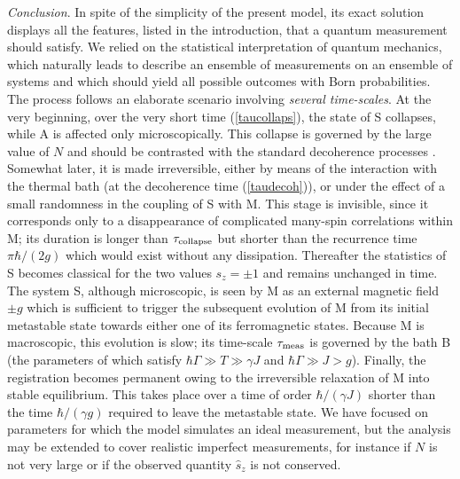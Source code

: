 \begin{multicols}{2}
{\it Conclusion}. In spite of the simplicity of the present model,
its exact solution displays all the features, listed in the introduction,
that a quantum measurement should satisfy. We relied on the
statistical interpretation of quantum mechanics, which naturally leads to
describe an ensemble of measurements on an ensemble of systems and 
which should yield all possible outcomes with Born probabilities.
The process follows an elaborate 
scenario involving {\it several time-scales}. At the very beginning,
over the very short time (\ref{taucollaps}), the state of S collapses,
while A is affected only microscopically. This collapse is governed by 
the large value of $N$ and should be contrasted with the standard decoherence 
processes \cite{wh,models}. 
Somewhat later, it is made irreversible, either by means of the 
interaction with the thermal bath (at the decoherence time (\ref{taudecoh})), 
or under the effect of a small randomness in the coupling
of S with M. This stage is invisible, since it corresponds only 
to a disappearance of complicated many-spin
correlations within M; its duration is longer than $\tau_{\rm collapse}$ 
but shorter than the recurrence time $\pi\hbar/(2g)$
which would exist without any dissipation.
Thereafter the statistics of S becomes classical for the two
values $s_z=\pm 1$ and remains unchanged in time. The system S, although
microscopic, is seen by M as an external magnetic field $\pm g$ which is
sufficient to trigger the subsequent evolution of M from its initial
metastable state towards either one of its ferromagnetic states. Because M
is macroscopic, this evolution is slow; its time-scale $\tau_{\rm meas}$
is governed by the bath B (the parameters of which satisfy
$\hbar\Gamma\gg T\gg \gamma J$ and $\hbar\Gamma\gg J>g$). Finally, the
registration becomes permanent owing to the irreversible relaxation of M
into stable equilibrium. This takes place over a time of order
$\hbar/(\gamma J)$ shorter than the time $\hbar/(\gamma g)$
required to leave the metastable state. 
We have focused on parameters for which the model simulates an ideal 
measurement, but the analysis may be extended to cover realistic imperfect 
measurements, for instance if $N$ is not very large or if the observed 
quantity $\hat{s}_z$ is not conserved.


\end{multicols}
